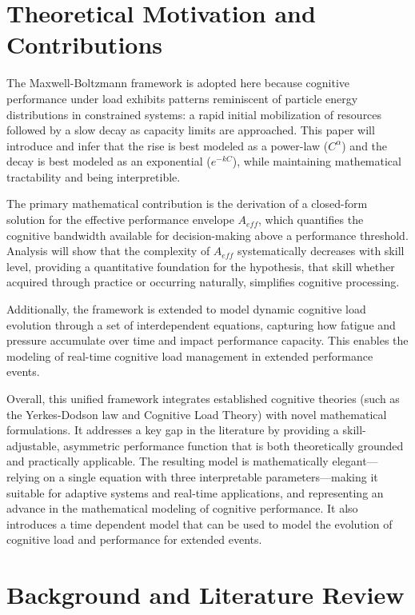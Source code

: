 \documentclass{article}
\begin{document}
\section*{Theoretical Motivation and Contributions}

The Maxwell-Boltzmann framework is adopted here because cognitive performance under load exhibits patterns reminiscent
of particle energy distributions in constrained systems: a rapid initial mobilization of resources followed by a slow
decay as capacity limits are approached.  This paper will introduce and infer that the rise is best modeled as a
power-law ($C^{\alpha}$) and the decay is best modeled as an exponential ($e^{-kC}$), while maintaining mathematical
tractability and being interpretible.

The primary mathematical contribution is the derivation of a closed-form solution for the effective performance envelope
$A_{eff}$, which quantifies the cognitive bandwidth available for decision-making above a performance threshold.
Analysis will show that the complexity of $A_{eff}$ systematically decreases with skill level, providing a quantitative
foundation for the hypothesis, that skill whether acquired through practice or occurring naturally, simplifies cognitive
processing.

Additionally, the framework is extended to model dynamic cognitive load evolution through a set of interdependent
equations, capturing how fatigue and pressure accumulate over time and impact performance capacity. This enables the
modeling of real-time cognitive load management in extended performance events.

Overall, this unified framework integrates established cognitive theories (such as the Yerkes-Dodson law and Cognitive
Load Theory) with novel mathematical formulations. It addresses a key gap in the literature by providing a
skill-adjustable, asymmetric performance function that is both theoretically grounded and practically applicable. The
resulting model is mathematically elegant—relying on a single equation with three interpretable parameters—making it
suitable for adaptive systems and real-time applications, and representing an advance in the mathematical modeling of
cognitive performance.  It also introduces a time dependent model that can be used to model the evolution of cognitive
load and performance for extended events.

\section*{Background and Literature Review}
\end{document}
